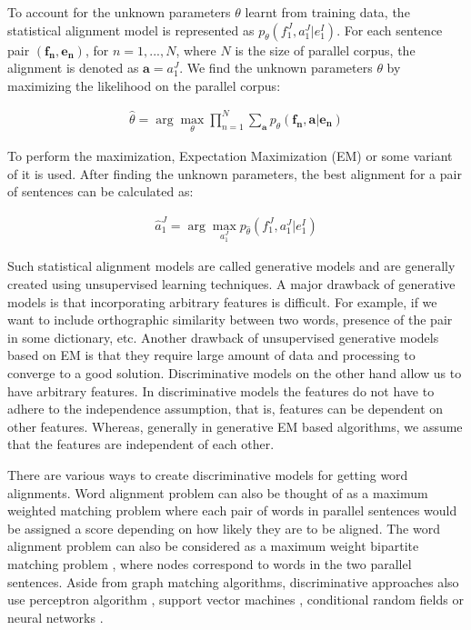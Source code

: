 To account for the unknown parameters $\theta$ learnt from training data, the statistical alignment model is represented as $p_{\theta}(f^J_1, a^J_1 | e^I_1)$. For each sentence pair $(\mathbf{f_n, e_n})$, for $n = 1, ..., N$, where $N$ is the size of parallel corpus, the alignment is denoted as $\mathbf{a} = a^J_1$. We find the unknown parameters $\theta$ by maximizing the likelihood on the parallel corpus:

\begin{eqnarray}
\hat{\theta} = \arg\!\max_\theta \prod_{n = 1}^{N} \sum_{\mathbf{a}} p_{\theta}(\mathbf{f_n}, \mathbf{a} | \mathbf{e_n})
\end{eqnarray}

To perform the maximization, Expectation Maximization (EM) \cite{Dempster1977} or some variant of it is used. After finding the unknown parameters, the best alignment for a pair of sentences can be calculated as:

\begin{eqnarray}
\hat{a}^J_1 = \arg\!\max_{a^J_1} p_{\hat{\theta}}(f^J_1, a^J_1 | e^I_1)
\end{eqnarray}

Such statistical alignment models are called generative models and are generally created using unsupervised learning techniques. A major drawback of generative models is that incorporating arbitrary features is difficult. For example, if we want to include orthographic similarity between two words, presence of the pair in some dictionary, etc. Another drawback of unsupervised generative models based on EM is that they require large amount of data and processing to converge to a good solution. Discriminative models on the other hand allow us to have arbitrary features. In discriminative models the features do not have to adhere to the independence assumption, that is, features can be dependent on other features. Whereas, generally in generative EM based algorithms, we assume that the features are independent of each other. 

There are various ways to create discriminative models for getting word alignments. Word alignment problem can also be thought of as a maximum weighted matching problem where each pair of words in parallel sentences would be assigned a score depending on how likely they are to be aligned. The word alignment problem can also be considered as a maximum weight bipartite matching problem \cite{Taskar2005}, where nodes correspond to words in the two parallel sentences. Aside from graph matching algorithms, discriminative approaches also use perceptron algorithm \cite{Moore2006}, support vector machines \cite{Cherry2006}, conditional random fields \cite{Blunsom2006} or neural networks \cite{Ayan2005}.

